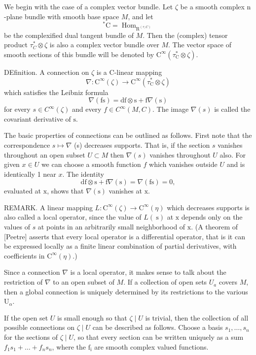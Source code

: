 \documentclass[10pt]{article}
\begin{document}
We begin with the case of a complex vector bundle. Let $\zeta$ be a smooth complex $\mathrm{n}$-plane bundle with smooth base space $M$, and let
$$
{ }^{*} \mathrm{C}=\operatorname{Hom}_{\mathrm{R}^{(\tau, C)}}
$$
be the complexified dual tangent bundle of $M$. Then the (complex) tensor product $\tau_{C}^{*} \otimes \zeta$ is also a complex vector bundle over $M$. The vector space of smooth sections of this bundle will be denoted by $\mathrm{C}^{\infty}\left(\tau_{\mathrm{C}}^{*} \otimes \zeta\right)$.

DEfinition. A connection on $\zeta$ is a C-linear mapping
$$
\nabla: \mathrm{C}^{\infty}(\zeta) \rightarrow \mathrm{C}^{\infty}\left(\tau_{\mathrm{C}}^{*} \otimes \zeta\right)
$$
which satisfies the Leibniz formula
$$
\nabla(\mathrm{fs})=\mathrm{df} \otimes \mathrm{s}+\mathrm{f} \nabla(\mathrm{s})
$$
for every $s \in C^{\infty}(\zeta)$ and every $f \in C^{\infty}(M, C)$. The image $\nabla(s)$ is called the covariant derivative of $\mathrm{s}$.

The basic properties of connections can be outlined as follows. First note that the correspondence $s \mapsto \nabla$ (s) decreases supports. That is, if the section $s$ vanishes throughout an open subset $U \subset M$ then $\nabla(s)$ vanishes throughout $U$ also. For given $x \in U$ we can choose a smooth function $f$ which vanishes outside $U$ and is identically 1 near $x$. The identity
$$
\mathrm{df} \otimes \mathrm{s}+\mathrm{f} \nabla(\mathrm{s})=\nabla(\mathrm{fs})=0,
$$
evaluated at $\mathrm{x}$, shows that $\nabla(\mathrm{s})$ vanishes at $\mathrm{x}$.

REMARK. A linear mapping $L: \mathrm{C}^{\infty}(\zeta) \rightarrow \mathrm{C}^{\infty}(\eta)$ which decreases supports is also called a local operator, since the value of $L(\mathrm{~s})$ at $\mathrm{x}$ depends only on the values of $s$ at points in an arbitrarily small neighborhood of $\mathrm{x}$. (A theorem of [Peetre] asserts that every local operator is a differential operator, that is it can be expressed locally as a finite linear combination of partial derivatives, with coefficients in $\mathrm{C}^{\infty}(\eta)$.)

Since a connection $\nabla$ is a local operator, it makes sense to talk about the restriction of $\nabla$ to an open subset of $M$. If a collection of open sets $U_{a}$ covers $M$, then a global connection is uniquely determined by its restrictions to the various $\mathrm{U}_{\alpha}$.

If the open set $U$ is small enough so that $\zeta \mid U$ is trivial, then the collection of all possible connections on $\zeta \mid U$ can be described as follows. Choose a basis $s_{1}, \ldots, s_{n}$ for the sections of $\zeta \mid U$, so that every section can be written uniquely as a sum $f_{1} s_{1}+\ldots+f_{n} s_{n}$, where the $\mathrm{f}_{\mathrm{i}}$ are smooth complex valued functions.
\end{document}
